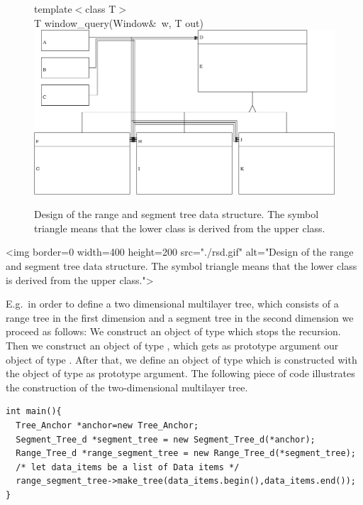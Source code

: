 \begin{ccTexOnly}
\begin{figure}
{{template$<$class T$>$\\
\hspace*{.2cm} T window\_query(Window$\&$~w, T out){}}}
\includegraphics[width=\textwidth,clip]{rangesegmentdesign.eps}
\caption{\label{rangesegmentdesign} Design of the range and
  segment tree data structure. The symbol triangle means
that the lower class is derived from the upper class. }
\end{figure}
\end{ccTexOnly}

\begin{ccHtmlOnly}
    <img border=0 width=400 height=200 src="./rsd.gif" alt="Design of the range and
  segment tree data structure. The symbol triangle means
that the lower class is derived from the upper class.">
\end{ccHtmlOnly}

E.g.\ in order to define a two dimensional multilayer tree, which
consists of a range tree  in the first dimension and a segment
tree in the second dimension we proceed as follows: We construct
an object of type  which stops the
recursion. Then we construct an object of type ,
which gets as prototype argument our object of type
. After that, we define an object of type
 which is constructed with the object of type
 as prototype argument.
The following piece of code illustrates
the construction of the two-dimensional multilayer tree.

\begin{verbatim}
int main(){
  Tree_Anchor *anchor=new Tree_Anchor;
  Segment_Tree_d *segment_tree = new Segment_Tree_d(*anchor);
  Range_Tree_d *range_segment_tree = new Range_Tree_d(*segment_tree);
  /* let data_items be a list of Data items */
  range_segment_tree->make_tree(data_items.begin(),data_items.end());
}
\end{verbatim}

